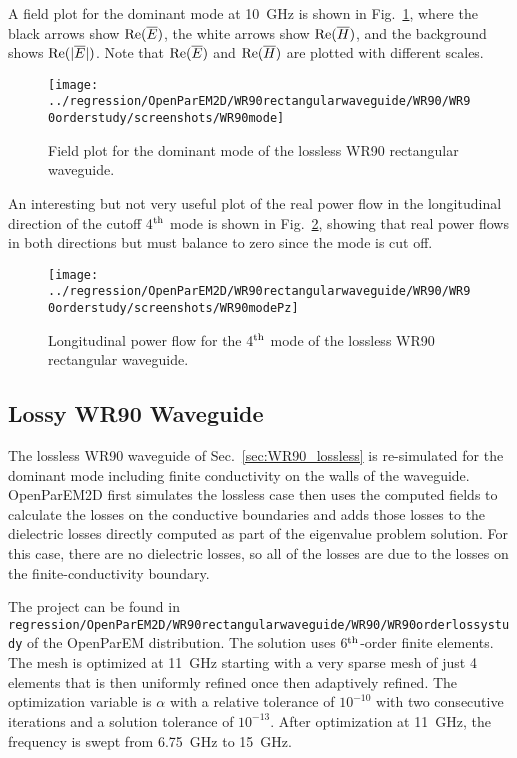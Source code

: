 \documentclass[titlepage]{article}
\renewcommand\_{\textunderscore\linebreak[1]}
\begin{document}
A field plot for the dominant mode at 10~GHz is shown in Fig.~\ref{fig:WR90_mode_1}, where the black arrows show $\textnormal{Re}(\overline{E})$, the white arrows show $\textnormal{Re}(\overline{H})$, and the background shows $\textnormal{Re}(|\overline{E}|)$.  Note that $\textnormal{Re}(\overline{E})$ and $\textnormal{Re}(\overline{H})$ are plotted with different scales.
\begin{figure}[H]
  \centering
  \texttt{[image: ../regression/OpenParEM2D/WR90\_rectangular\_waveguide/WR90/WR90\_order\_6\_study/screenshots/WR90\_mode\_1]}
  \caption{Field plot for the dominant mode of the lossless WR90 rectangular waveguide.}
  \label{fig:WR90_mode_1}
\end{figure}
An interesting but not very useful plot of the real power flow in the longitudinal direction of the cutoff 4$^{\textnormal{th}}$ mode is shown in Fig.~\ref{fig:WR90_mode_4_Pz}, showing that real power flows in both directions but must balance to zero since the mode is cut off.
\begin{figure}[H]
  \centering
  \texttt{[image: ../regression/OpenParEM2D/WR90\_rectangular\_waveguide/WR90/WR90\_order\_6\_study/screenshots/WR90\_mode\_4\_Pz]}
  \caption{Longitudinal power flow for the 4$^{\textnormal{th}}$ mode of the lossless WR90 rectangular waveguide.}
  \label{fig:WR90_mode_4_Pz}
\end{figure}

\subsection{Lossy WR90 Waveguide}

The lossless WR90 waveguide of Sec.~\ref{sec:WR90_lossless} is re-simulated for the dominant mode including finite conductivity on the walls of the waveguide.  OpenParEM2D first simulates the lossless case then uses the computed fields to calculate the losses on the conductive boundaries and adds those losses to the dielectric losses directly computed as part of the eigenvalue problem solution.  For this case, there are no dielectric losses, so all of the losses are due to the losses on the finite-conductivity boundary.

The project can be found in \texttt{regression/OpenParEM2D/WR90\_rectangular\_waveguide/WR90/WR90\_order\_6\_lossy\_study} of the OpenParEM distribution. The solution uses 6$^{\textnormal{th}}$-order finite elements. The mesh is optimized at 11~GHz starting with a very sparse mesh of just 4 elements that is then uniformly refined once then adaptively refined. The optimization variable is $\alpha$ with a relative tolerance of $10^{-10}$ with two consecutive iterations and a solution tolerance of $10^{-13}$. After optimization at 11~GHz, the frequency is swept from 6.75~GHz to 15~GHz.
\end{document}
